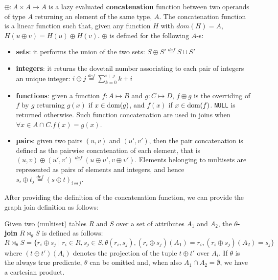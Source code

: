 \begin{definition}[Concatenation]\label{def:concatenation}
	$\oplus:A\times A\mapsto A$ is a {{lazy evaluated}} \textbf{concatenation} function between two 
	operands of type $A$ returning an element of the same type, $A$. The concatenation function is a linear function such that, given any function $H$ with $dom(H)=A$, $H(u\oplus v)=H(u)\oplus H(v)$. $\oplus$ is defined for the following $A$-s:
	\begin{itemize}
		\item \textbf{sets}: it performs the union of the two sets:\qquad
		$S\oplus S'\overset{def}{=}S \cup S'$
		\item \textbf{integers}: it returns the dovetail number associating to each pair of
		integers an unique integer:
		$i\oplus j\overset{def}{=}\sum_{k=0}^{i+j}k+i$
		\item \textbf{functions}: given a function $f:A\mapsto B$ and $g:C\mapsto D$, $f\oplus g$ is the overriding of $f$ by $g$ returning $g(x)$ if $x\in \operatorname{dom}(g)$, and $f(x)$ if $x\in \operatorname{dom}(f)$. \texttt{NULL} is returned otherwise.
		Such function concatenation are used in joins when $\forall x\in A\cap C. f(x)=g(x)$.
		
		\item \textbf{pairs}: given two pairs $(u,v)$ and $(u',v')$, then
		the pair concatenation is defined as the pairwise {{concatenation}} of each element, that is $(u,v)\oplus (u',v')\overset{def}{=}(u\oplus u',v\oplus v')$. 
		Elements belonging to multisets are represented as pairs of
		elements and integers, and hence $s_i\oplus t_j\overset{def}{=}(s\oplus t)_{i\oplus j}$.
		
	\end{itemize}
\end{definition}

After providing the definition of the concatenation function, we can provide the graph join definition as follows:

\begin{definition}\label{def:thetajoin}
	Given two (multiset) tables $R$ and $S$ over a set
	of attributes $A_1$ and $A_2$, the \textbf{$\theta$-join} $R\bowtie_\theta S$ \cite{atzeniEN,atzeniIT} is defined as follows:
	\begin{equation*}
	R\bowtie_\theta S=\{r_i\oplus s_j\mid r_i\in R, s_j\in S,\theta(r_i,s_j), (r_i\oplus s_j)(A_1)=r_i, (r_i\oplus s_j)(A_2)=s_j\}
	\end{equation*}
	where $(t\oplus t')(A_i)$ denotes the projection of the tuple $t\oplus t'$ over $A_i$.
	If $\theta$ is the always true predicate, $\theta$ {{can}} be omitted and, when also $A_1\cap A_2=\emptyset$, we have a cartesian product.
\end{definition} 

